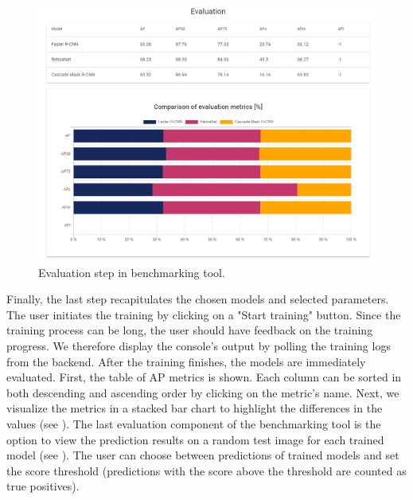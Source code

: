 \begin{figure}[ht]
    \includegraphics[width=\linewidth]{Sources/Figures/eval_table_plot.png}
    \caption{Evaluation step in benchmarking tool.}
    \label{fig:evaluation-step}
\end{figure}

Finally, the last step recapitulates the chosen models and selected parameters.
The user initiates the training by clicking on a "Start training" button. Since
the training process can be long, the user should have feedback on the training
progress. We therefore display the console's output by polling the training logs
from the backend. After the training finishes, the models are immediately
evaluated. First, the table of AP metrics is shown. Each column can be sorted in
both descending and ascending order by clicking on the metric's name. Next, we
visualize the metrics in a stacked bar chart to highlight the differences in the
values (see ). The last evaluation component of
the benchmarking tool is the option to view the prediction results on a random
test image for each trained model (see ). The
user can choose between predictions of trained models and set the score
threshold (predictions with the score above the threshold are counted as
true positives).

